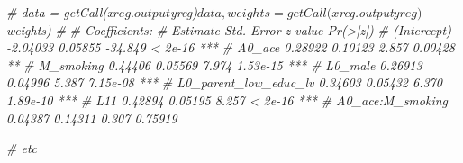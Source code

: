 \documentclass[
]{book}
\newenvironment{Shaded}{\begin{snugshade}}{\end{snugshade}}
\newcommand{\CommentTok}[1]{\textcolor[rgb]{0.56,0.35,0.01}{\textit{#1}}}
\begin{document}
\begin{Shaded}
\begin{Highlighting}[]
\CommentTok{\#     data = getCall(x$reg.output$yreg)$data, weights = getCall(x$reg.output$yreg)$weights)}
\CommentTok{\# }
\CommentTok{\# Coefficients:}
\CommentTok{\#                       Estimate Std. Error z value Pr(\textgreater{}|z|)    }
\CommentTok{\# (Intercept)           {-}2.04033    0.05855 {-}34.849  \textless{} 2e{-}16 ***}
\CommentTok{\# A0\_ace                 0.28922    0.10123   2.857  0.00428 ** }
\CommentTok{\# M\_smoking              0.44406    0.05569   7.974 1.53e{-}15 ***}
\CommentTok{\# L0\_male                0.26913    0.04996   5.387 7.15e{-}08 ***}
\CommentTok{\# L0\_parent\_low\_educ\_lv  0.34603    0.05432   6.370 1.89e{-}10 ***}
\CommentTok{\# L11                    0.42894    0.05195   8.257  \textless{} 2e{-}16 ***}
\CommentTok{\# A0\_ace:M\_smoking       0.04387    0.14311   0.307  0.75919   }

\CommentTok{\# etc}


\end{Highlighting}
\end{Shaded}
\end{document}
